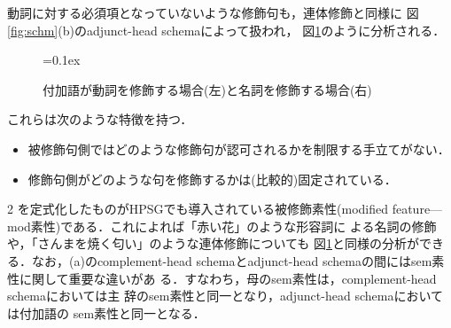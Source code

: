 動詞に対する必須項となっていないような修飾句も，連体修飾と同様に
図\ref{fig:schm}(b)のadjunct-head schemaによって扱われ，
図\ref{fig:modifier}のように分析される．
\begin{figure}
\begin{center}
\unitlength=0.1ex
\parbox{0.45\textwidth}{}\quad
\parbox{0.45\textwidth}{}
\end{center}
\caption{付加語が動詞を修飾する場合(左)と名詞を修飾する場合(右)}
\label{fig:modifier}
\end{figure}
これらは次のような特徴を持つ．
\begin{itemize}
\item[1.] 被修飾句側ではどのような修飾句が認可されるかを制限する手立てがない．
\item[2.] 修飾句側がどのような句を修飾するかは(比較的)固定されている．
\end{itemize}
2 を定式化したものがHPSGでも導入されている被修飾素性(modified
feature---{\sc mod}素性)である．これによれば「赤い花」のような形容詞に
よる名詞の修飾や，「さんまを焼く匂い」のような連体修飾についても
図\ref{fig:modifier}と同様の分析ができる．なお，(a)のcomplement-head
schemaとadjunct-head schemaの間には{\sc sem}素性に関して重要な違いがあ
る．すなわち，母の{\sc sem}素性は，complement-head schemaにおいては主
辞の{\sc sem}素性と同一となり，adjunct-head schemaにおいては付加語の
{\sc sem}素性と同一となる．

